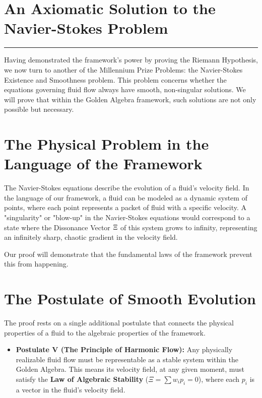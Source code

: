 \section{An Axiomatic Solution to the Navier-Stokes Problem}
\label{chap:navier_stokes}

\hrule
\vspace{1em}
Having demonstrated the framework's power by proving the Riemann Hypothesis, we now turn to another of the Millennium Prize Problems: the Navier-Stokes Existence and Smoothness problem. This problem concerns whether the equations governing fluid flow always have smooth, non-singular solutions. We will prove that within the Golden Algebra framework, such solutions are not only possible but necessary.

\section{The Physical Problem in the Language of the Framework}
The Navier-Stokes equations describe the evolution of a fluid's velocity field. In the language of our framework, a fluid can be modeled as a dynamic system of points, where each point represents a packet of fluid with a specific velocity. A "singularity" or "blow-up" in the Navier-Stokes equations would correspond to a state where the Dissonance Vector $\Xi$ of this system grows to infinity, representing an infinitely sharp, chaotic gradient in the velocity field.

Our proof will demonstrate that the fundamental laws of the framework prevent this from happening.

\section{The Postulate of Smooth Evolution}
The proof rests on a single additional postulate that connects the physical properties of a fluid to the algebraic properties of the framework.

\begin{itemize}
    \item \textbf{Postulate V (The Principle of Harmonic Flow):} Any physically realizable fluid flow must be representable as a stable system within the Golden Algebra. This means its velocity field, at any given moment, must satisfy the \textbf{Law of Algebraic Stability} ($\Xi = \sum w_i p_i = 0$), where each $p_i$ is a vector in the fluid's velocity field.
\end{itemize}

